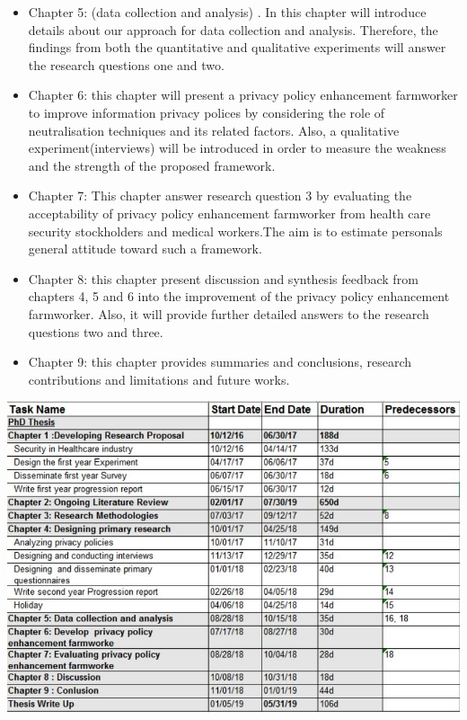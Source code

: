 \begin{itemize}
	\item {Chapter 5: (data collection and analysis) }. In this chapter will introduce details about our approach for data collection and analysis. Therefore, the findings from both the quantitative and qualitative experiments will answer the research questions one and two.
	\item {Chapter 6:} this chapter will present a privacy policy enhancement farmworker to improve information privacy polices by considering the role of neutralisation techniques and its related factors. Also, a qualitative experiment(interviews) will be introduced in order to measure the weakness and the strength of the proposed framework.
	\item {Chapter 7:} This chapter answer research question 3 by evaluating the acceptability of privacy policy enhancement farmworker from health care security stockholders and medical workers.The aim is to estimate personals general attitude toward such a framework. 
	\item{Chapter 8:} this chapter present discussion and synthesis feedback from chapters 4, 5 and 6 into the improvement of the privacy policy enhancement farmworker. Also, it will provide further detailed answers to the research questions two and three. 
	\item{Chapter 9:} this chapter provides summaries and conclusions, research contributions and limitations and future works.

\end{itemize}
 \graphicspath{ {image/} }
 \begin{center}
 	\includegraphics [scale=0.7]{Gantt_Chart_Table_FV.JPG}
\end{center}

